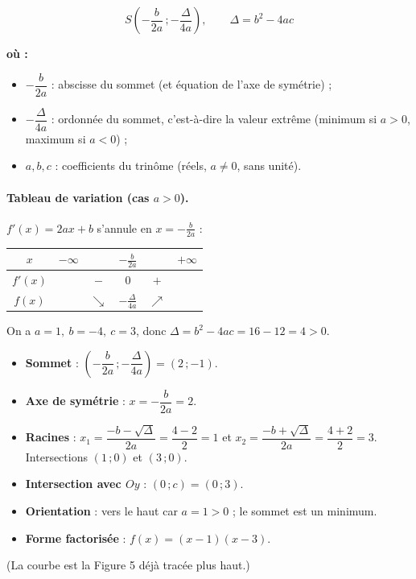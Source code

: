 \documentclass[11pt,a4paper]{article}
\newenvironment{ou}{%
  \par\smallskip\noindent\textbf{où :}\nopagebreak
  \begin{itemize}[leftmargin=1.8em,topsep=2pt,itemsep=1.5pt,parsep=0pt]}%
  {\end{itemize}}
\newcommand{\croit}{\textcolor{varcol}{\Large$\nearrow$}}
\newcommand{\decroit}{\textcolor{varcol}{\Large$\searrow$}}
\begin{document}
\begin{formule}
\[
  \boxed{\;S\left(-\dfrac{b}{2a}\,;-\dfrac{\Delta}{4a}\right),\qquad \Delta=b^2-4ac\;}
\]
\begin{ou}
  \item $-\dfrac{b}{2a}$ : abscisse du sommet (et équation de l'axe de symétrie) ;
  \item $-\dfrac{\Delta}{4a}$ : ordonnée du sommet, c'est-à-dire la valeur extrême
        (minimum si $a>0$, maximum si $a<0$) ;
  \item $a,b,c$ : coefficients du trinôme (réels, $a\neq 0$, sans unité).
\end{ou}
\end{formule}

\paragraph{Tableau de variation (cas $a>0$).} $f'(x)=2ax+b$ s'annule en $x=-\frac{b}{2a}$ :

\begin{center}
\renewcommand{\arraystretch}{1.6}\setlength{\tabcolsep}{12pt}
\begin{tabular}{|c|ccccc|}
\hline
\rowcolor{primarylight}
$x$ & $-\infty$ & & $-\tfrac{b}{2a}$ & & $+\infty$ \\
\hline
$f'(x)$ & & $-$ & $0$ & $+$ & \\
\hline
$f(x)$ & & \decroit & $-\tfrac{\Delta}{4a}$ & \croit & \\
\hline
\end{tabular}
\end{center}

\begin{exemple}[Étude complète de $f(x)=x^2-4x+3$]
On a $a=1,\ b=-4,\ c=3$, donc $\Delta=b^2-4ac=16-12=4>0$.
\begin{itemize}[leftmargin=1.5em,topsep=2pt]
  \item \textbf{Sommet} : $\left(-\dfrac{b}{2a}\,;-\dfrac{\Delta}{4a}\right)=(2\,;-1)$.
  \item \textbf{Axe de symétrie} : $x=-\dfrac{b}{2a}=2$.
  \item \textbf{Racines} : $x_1=\dfrac{-b-\sqrt\Delta}{2a}=\dfrac{4-2}{2}=1$ et
        $x_2=\dfrac{-b+\sqrt\Delta}{2a}=\dfrac{4+2}{2}=3$.
        \;Intersections $(1\,;0)$ et $(3\,;0)$.
  \item \textbf{Intersection avec $Oy$} : $(0\,;c)=(0\,;3)$.
  \item \textbf{Orientation} : vers le haut car $a=1>0$ ; le sommet est un minimum.
  \item \textbf{Forme factorisée} : $f(x)=(x-1)(x-3)$.
\end{itemize}
(La courbe est la Figure 5 déjà tracée plus haut.)
\end{exemple}
\end{document}
